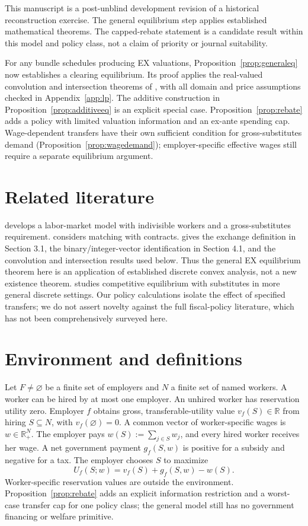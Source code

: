 \documentclass[11pt]{article}
\theoremstyle{definition}
\theoremstyle{remark}
\numberwithin{equation}{section}
\begin{document}
This manuscript is a post-unblind development revision of a historical reconstruction exercise. The general equilibrium step applies established mathematical theorems. The capped-rebate statement is a candidate result within this model and policy class, not a claim of priority or journal suitability.

For any bundle schedules producing EX valuations, Proposition~\ref{prop:generaleq} now establishes a clearing equilibrium. Its proof applies the real-valued convolution and intersection theorems of \citet[Theorems 6.1(9) and 9.4]{Murota2022}, with all domain and price assumptions checked in Appendix~\ref{app:lp}. The additive construction in Proposition~\ref{prop:additiveeq} is an explicit special case. Proposition~\ref{prop:rebate} adds a policy with limited valuation information and an ex-ante spending cap. Wage-dependent transfers have their own sufficient condition for gross-substitutes demand (Proposition~\ref{prop:wagedemand}); employer-specific effective wages still require a separate equilibrium argument.

\section{Related literature}
\citet{KelsoCrawford1982} develops a labor-market model with indivisible workers and a gross-substitutes requirement. \citet{HatfieldMilgrom2005} considers matching with contracts. \citet{Murota2022} gives the exchange definition in Section 3.1, the binary/integer-vector identification in Section 4.1, and the convolution and intersection results used below. Thus the general EX equilibrium theorem here is an application of established discrete convex analysis, not a new existence theorem. \citet{ChenEtAl2023} studies competitive equilibrium with substitutes in more general discrete settings. Our policy calculations isolate the effect of specified transfers; we do not assert novelty against the full fiscal-policy literature, which has not been comprehensively surveyed here.

\section{Environment and definitions}
Let $F\ne\varnothing$ be a finite set of employers and $N$ a finite set of named workers. A worker can be hired by at most one employer. An unhired worker has reservation utility zero. Employer $f$ obtains gross, transferable-utility value $v_f(S)\in\mathbb R$ from hiring $S\subseteq N$, with $v_f(\varnothing)=0$. A common vector of worker-specific wages is $w\in\mathbb R_+^N$. The employer pays $w(S):=\sum_{j\in S}w_j$, and every hired worker receives her wage. A net government payment $g_f(S,w)$ is positive for a subsidy and negative for a tax. The employer chooses $S$ to maximize
\begin{equation}
 U_f(S;w)=v_f(S)+g_f(S,w)-w(S).                 \label{eq:profit}
\end{equation}
Worker-specific reservation values are outside the environment. Proposition~\ref{prop:rebate} adds an explicit information restriction and a worst-case transfer cap for one policy class; the general model still has no government financing or welfare primitive.
\end{document}
